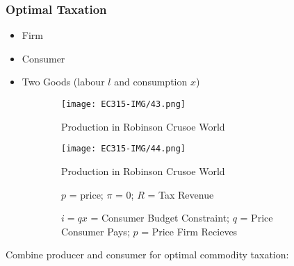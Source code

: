 \documentclass[11pt, english]{article}
\begin{document}
		\subsubsection{Optimal Taxation}

	\begin{itemize}
	\setlength\itemsep{0cm}
		\item Firm
		\item Consumer
		\item Two Goods (labour $l$ and consumption $x$)
	\end{itemize}

	\begin{figure}[H]
        \begin{center}
                \begin{subfigure}[t]{7cm}
                \begin{center}
                        \texttt{[image: EC315-IMG/43.png]}
                \end{center}
			\caption{Production in Robinson Crusoe World}
                \end{subfigure}
                \begin{subfigure}[t]{7cm}
                \begin{center}
                        \texttt{[image: EC315-IMG/44.png]}
                \end{center}
			\caption{Production in Robinson Crusoe World}
                \end{subfigure}
        \quad
                \begin{subfigure}[t]{3.5cm}
                \begin{center}
			$p$ = price; $\pi$ = 0; $R$ = Tax Revenue
                \end{center}
                \end{subfigure}
                \begin{subfigure}[t]{3.5cm}
                \begin{center}
			$i=qx$ = Consumer Budget Constraint; $q$ = Price Consumer Pays; $p$ = Price Firm Recieves
                \end{center}
                \end{subfigure}
        \end{center}
        \end{figure}

	Combine producer and consumer for optimal commodity taxation:
	
\end{document}
